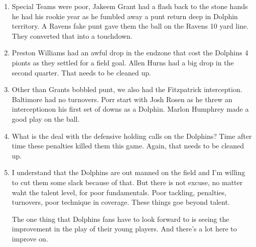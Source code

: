 \begin{enumerate}

\item  Special Teams were poor, Jakeem Grant had a flash back to the stone hands he had his rookie year as he fumbled away a punt return deep in Dolphin territory.  A Ravens fake punt gave them the ball on the Ravens 10 yard line.  They converted that into a touchdown.
\item Preston Williams had an awful drop in the endzone that cost the Dolphins 4 pionts as they settled for a field goal.  Allen Hurns had a big drop in the second quarter.  That needs to be cleaned up.
\item Other than Grants bobbled punt, we also had the Fitzpatrick interception.  Baltimore had no turnovers.  Porr start with Josh Rosen as he threw an interceptionon his first set of downs as a Dolphin.  Marlon Humphrey made a good play on the ball.
\item What is the deal with the defensive holding calls on the Dolphins?  Time after time these penalties killed them this game.  Again, that needs to be cleaned up.
\item I understand that the Dolphins are out manned on the field and I'm willing to cut them some slack because of that.  But there is not excuse, no matter waht the talent level, for poor fundamentals.  Poor tackling, penalties, turnovers, poor technique in coverage.  These things goe beyond talent.

  \begin{minipage}{1.0\linewidth}
    The one thing that Dolphins fans have to look forward to is seeing the improvement in the play of their young players.  And there's a lot here to improve on.
  \end{minipage}
\end{enumerate}